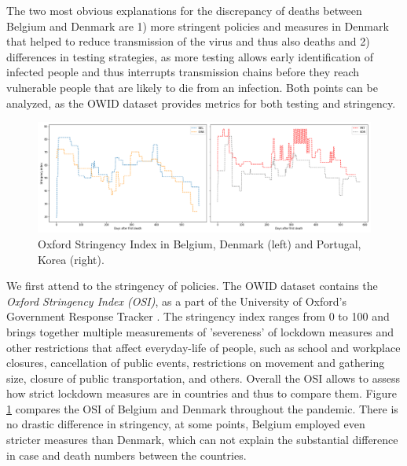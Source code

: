 \documentclass[a4paper,11pt]{article}
\begin{document}
The two most obvious explanations for the discrepancy of deaths between Belgium and Denmark are 1) more stringent policies and measures in Denmark that helped to reduce transmission of the virus and thus also deaths and 2) differences in testing strategies,
as more testing allows early identification of infected people and thus interrupts transmission chains before they reach 
vulnerable people that are likely to die from an infection.
Both points can be analyzed, as the OWID dataset provides metrics for both testing and stringency.

\begin{figure}[htb]
    \centering
    \includegraphics[width=\textwidth]{figures/stringency_2plot.png}
    \caption{Oxford Stringency Index \cite{hale2021global} in Belgium, Denmark (left) and Portugal, Korea (right).}
    \label{fig:stringency}
\end{figure}

We first attend to the stringency of policies. The OWID dataset contains the \textit{Oxford Stringency Index (OSI)}, as a part of the 
University of Oxford's Government Response Tracker \cite{hale2021global}. The stringency index ranges from 0 to 100 and brings together multiple 
measurements of 'severeness' of lockdown measures and other restrictions that affect everyday-life of people, such as
school and workplace closures, cancellation of public events, restrictions on movement and gathering size, closure of public transportation, and others. Overall the OSI allows to assess how strict lockdown measures are in countries and thus 
to compare them.
Figure \ref{fig:stringency} compares the OSI of Belgium and Denmark throughout the pandemic. There is no drastic difference in stringency,
at some points, Belgium employed even stricter measures than Denmark, which can not explain the substantial difference in 
case and death numbers between the countries.
\end{document}
